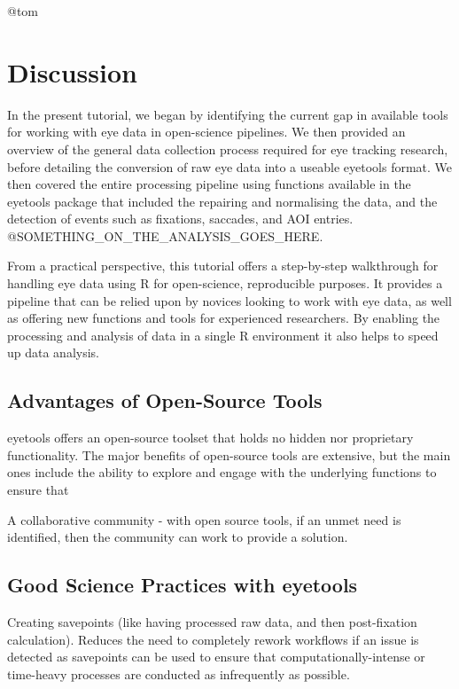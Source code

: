 \documentclass[
  man,
  floatsintext,
  longtable,
  nolmodern,
  notxfonts,
  notimes,
  colorlinks=true,linkcolor=blue,citecolor=blue,urlcolor=blue]{apa7}
\begin{document}
@tom

\section{Discussion}\label{discussion}

In the present tutorial, we began by identifying the current gap in
available tools for working with eye data in open-science pipelines. We
then provided an overview of the general data collection process
required for eye tracking research, before detailing the conversion of
raw eye data into a useable eyetools format. We then covered the entire
processing pipeline using functions available in the eyetools package
that included the repairing and normalising the data, and the detection
of events such as fixations, saccades, and AOI entries.
@SOMETHING\_ON\_THE\_ANALYSIS\_GOES\_HERE.

From a practical perspective, this tutorial offers a step-by-step
walkthrough for handling eye data using R for open-science, reproducible
purposes. It provides a pipeline that can be relied upon by novices
looking to work with eye data, as well as offering new functions and
tools for experienced researchers. By enabling the processing and
analysis of data in a single R environment it also helps to speed up
data analysis.

\subsection{Advantages of Open-Source
Tools}\label{advantages-of-open-source-tools}

eyetools offers an open-source toolset that holds no hidden nor
proprietary functionality. The major benefits of open-source tools are
extensive, but the main ones include the ability to explore and engage
with the underlying functions to ensure that

A collaborative community - with open source tools, if an unmet need is
identified, then the community can work to provide a solution.

\subsection{Good Science Practices with
eyetools}\label{good-science-practices-with-eyetools}

Creating savepoints (like having processed raw data, and then
post-fixation calculation). Reduces the need to completely rework
workflows if an issue is detected as savepoints can be used to ensure
that computationally-intense or time-heavy processes are conducted as
infrequently as possible.
\end{document}
